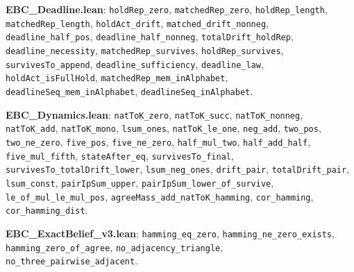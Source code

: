 \documentclass[11pt,a4paper]{article}
\theoremstyle{plain}
\theoremstyle{definition}
\theoremstyle{remark}
\begin{document}
\textbf{EBC\_Deadline.lean}: \texttt{holdRep\_\allowbreak{}zero}, \texttt{matchedRep\_\allowbreak{}zero}, \texttt{holdRep\_\allowbreak{}length}, \texttt{matchedRep\_\allowbreak{}length}, \texttt{holdAct\_\allowbreak{}drift}, \texttt{matched\_\allowbreak{}drift\_\allowbreak{}nonneg}, \texttt{deadline\_\allowbreak{}half\_\allowbreak{}pos}, \texttt{deadline\_\allowbreak{}half\_\allowbreak{}nonneg}, \texttt{totalDrift\_\allowbreak{}holdRep}, \texttt{deadline\_\allowbreak{}necessity}, \texttt{matchedRep\_\allowbreak{}survives}, \texttt{holdRep\_\allowbreak{}survives}, \texttt{survivesTo\_\allowbreak{}append}, \texttt{deadline\_\allowbreak{}sufficiency}, \texttt{deadline\_\allowbreak{}law}, \texttt{holdAct\_\allowbreak{}isFullHold}, \texttt{matchedRep\_\allowbreak{}mem\_\allowbreak{}inAlphabet}, \texttt{deadlineSeq\_\allowbreak{}mem\_\allowbreak{}inAlphabet}, \texttt{deadlineSeq\_\allowbreak{}inAlphabet}.

\textbf{EBC\_Dynamics.lean}: \texttt{natToK\_\allowbreak{}zero}, \texttt{natToK\_\allowbreak{}succ}, \texttt{natToK\_\allowbreak{}nonneg}, \texttt{natToK\_\allowbreak{}add}, \texttt{natToK\_\allowbreak{}mono}, \texttt{lsum\_\allowbreak{}ones}, \texttt{natToK\_\allowbreak{}le\_\allowbreak{}one}, \texttt{neg\_\allowbreak{}add}, \texttt{two\_\allowbreak{}pos}, \texttt{two\_\allowbreak{}ne\_\allowbreak{}zero}, \texttt{five\_\allowbreak{}pos}, \texttt{five\_\allowbreak{}ne\_\allowbreak{}zero}, \texttt{half\_\allowbreak{}mul\_\allowbreak{}two}, \texttt{half\_\allowbreak{}add\_\allowbreak{}half}, \texttt{five\_\allowbreak{}mul\_\allowbreak{}fifth}, \texttt{stateAfter\_\allowbreak{}eq}, \texttt{survivesTo\_\allowbreak{}final}, \texttt{survivesTo\_\allowbreak{}totalDrift\_\allowbreak{}lower}, \texttt{lsum\_\allowbreak{}neg\_\allowbreak{}ones}, \texttt{drift\_\allowbreak{}pair}, \texttt{totalDrift\_\allowbreak{}pair}, \texttt{lsum\_\allowbreak{}const}, \texttt{pairIpSum\_\allowbreak{}upper}, \texttt{pairIpSum\_\allowbreak{}lower\_\allowbreak{}of\_\allowbreak{}survive}, \texttt{le\_\allowbreak{}of\_\allowbreak{}mul\_\allowbreak{}le\_\allowbreak{}mul\_\allowbreak{}pos}, \texttt{agreeMass\_\allowbreak{}add\_\allowbreak{}natToK\_\allowbreak{}hamming}, \texttt{cor\_\allowbreak{}hamming}, \texttt{cor\_\allowbreak{}hamming\_\allowbreak{}dist}.

\textbf{EBC\_ExactBelief\_v3.lean}: \texttt{hamming\_\allowbreak{}eq\_\allowbreak{}zero}, \texttt{hamming\_\allowbreak{}ne\_\allowbreak{}zero\_\allowbreak{}exists}, \texttt{hamming\_\allowbreak{}zero\_\allowbreak{}of\_\allowbreak{}agree}, \texttt{no\_\allowbreak{}adjacency\_\allowbreak{}triangle}, \texttt{no\_\allowbreak{}three\_\allowbreak{}pairwise\_\allowbreak{}adjacent}.
\end{document}
